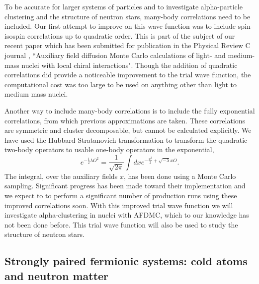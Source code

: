 \documentclass[12pt,letterpaper]{article}
\begin{document}
To be accurate for larger systems of particles and to investigate alpha-particle clustering and the structure of neutron stars, many-body correlations need to be included. Our first attempt to improve on this wave function was to include spin-isospin correlations up to quadratic order. This is part of the subject of our recent paper which has been submitted for publication in the Physical Review C journal \cite{lon18}, ``Auxiliary field diffusion Monte Carlo calculations of light- and medium-mass nuclei with local chiral interactions". Though the addition of quadratic correlations did provide a noticeable improvement to the trial wave function, the computational cost was too large to be used on anything other than light to medium mass nuclei.

Another way to include many-body correlations is to include the fully exponential correlations, from which previous approximations are taken. These correlations are symmetric and cluster decomposable, but cannot
be calculated explicitly. We have used the Hubbard-Stratanovich transformation to transform the quadratic two-body operators to usable one-body operators in the exponential,
\begin{equation}
   e^{-\frac{1}{2}\lambda O^2} = \frac{1}{\sqrt{2\pi}} \int dx e^{-\frac{x^2}{2} + \sqrt{-\lambda}x O}.
\end{equation}
The integral, over the auxiliary fields $x$, has been done using a Monte Carlo sampling. Significant progress has been made toward their implementation and we expect to to perform a significant number of production runs using these improved correlations soon. With this improved trial wave function we will investigate alpha-clustering in nuclei with AFDMC, which to our knowledge has not been done before. This trial wave function will also be used to study the structure of neutron stars.

\subsection{Strongly paired fermionic systems: cold atoms and neutron matter}
\end{document}
